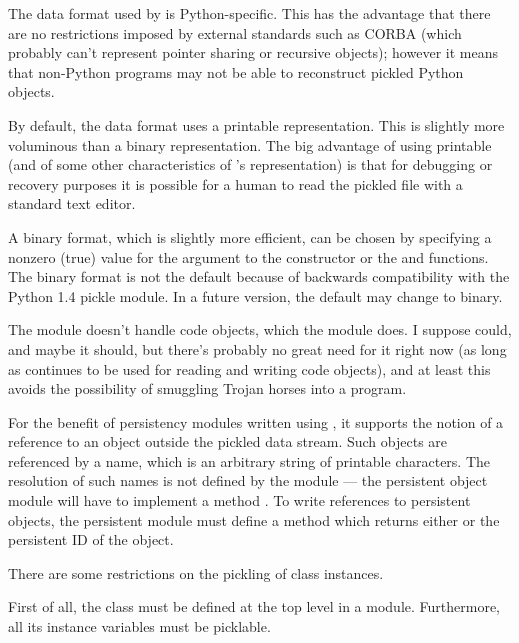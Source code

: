 The data format used by  is Python-specific.  This has
the advantage that there are no restrictions imposed by external
standards such as CORBA (which probably can't represent pointer
sharing or recursive objects); however it means that non-Python
programs may not be able to reconstruct pickled Python objects.

By default, the  data format uses a printable \ASCII{}
representation.  This is slightly more voluminous than a binary
representation.  The big advantage of using printable \ASCII{} (and of
some other characteristics of 's representation) is that
for debugging or recovery purposes it is possible for a human to read
the pickled file with a standard text editor.

A binary format, which is slightly more efficient, can be chosen by
specifying a nonzero (true) value for the  argument to the
 constructor or the  and 
functions.  The binary format is not the default because of backwards
compatibility with the Python 1.4 pickle module.  In a future version,
the default may change to binary.

The  module doesn't handle code objects, which the
 module does.  I suppose  could, and maybe
it should, but there's probably no great need for it right now (as
long as  continues to be used for reading and writing
code objects), and at least this avoids the possibility of smuggling
Trojan horses into a program.

For the benefit of persistency modules written using , it
supports the notion of a reference to an object outside the pickled
data stream.  Such objects are referenced by a name, which is an
arbitrary string of printable \ASCII{} characters.  The resolution of
such names is not defined by the  module --- the
persistent object module will have to implement a method
.  To write references to persistent objects,
the persistent module must define a method  which
returns either  or the persistent ID of the object.

There are some restrictions on the pickling of class instances.

First of all, the class must be defined at the top level in a module.
Furthermore, all its instance variables must be picklable.

\renewcommand{\indexsubitem}{(pickle protocol)}

